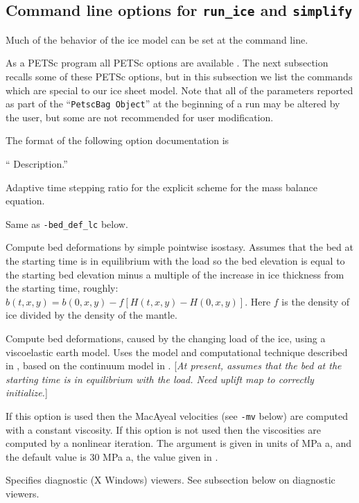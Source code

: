 \documentclass[final]{amsart}
\renewcommand{\t}[1]{\texttt{#1}}
\begin{document}
\subsection{Command line options for \t{run\_ice} and \t{simplify}}  Much of the behavior of the ice model can be set at the command line.  

As a PETSc program all PETSc options are available \cite{petsc-web-page,petsc-user-ref}.  The next subsection recalls some of these PETSc options, but in this subsection we list the commands which are special to our ice sheet model.  Note that all of the parameters reported as part of the ``\verb|PetscBag Object|'' at the beginning of a run may be altered by the user, but some are not recommended for user modification.  

The format of the following option documentation is

\centerline{`` Description.''}
\bigskip

  Adaptive time stepping ratio for the explicit scheme for the mass balance equation.

 Same as \verb|-bed_def_lc| below.

 Compute bed deformations by simple pointwise isostasy.  Assumes that the bed at the starting time is in equilibrium with the load so the bed elevation is equal to the starting bed elevation minus a multiple of the increase in ice thickness from the starting time, roughly: $b(t,x,y) = b(0,x,y) - f [H(t,x,y) - H(0,x,y)]$.  Here $f$ is the density of ice divided by the density of the mantle.

 Compute bed deformations, caused by the changing load of the ice, using a viscoelastic earth model.  Uses the model and computational technique described in \cite{BLKfastearth}, based on the continuum model in \cite{LingleClark}.  [\emph{At present, assumes that the bed at the starting time is in equilibrium with the load.  Need uplift map to correctly initialize.}]

  If this option is used then the MacAyeal velocities (see \verb|-mv| below) are computed with a constant viscosity.  If this option is not used then the viscosities are computed by a nonlinear iteration.  The argument is given in units of MPa a, and the default value is $30$ MPa a, the value given in \cite{Ritzetal2001}.

  Specifies diagnostic (X Windows) viewers.  See subsection below on diagnostic viewers.
\end{document}
